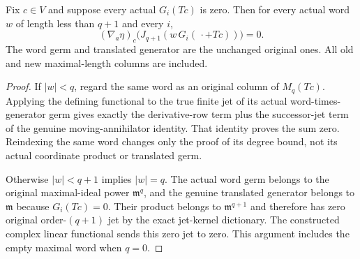 \begin{theorem}
\label{hir:actual-dual-jet-prolongation-all-next-columns-zero}
\leanok
Fix $c\in V$ and suppose every actual $G_i(Tc)$ is zero. Then for
every actual word $w$ of length less than $q+1$ and every $i$,
\[
 (\nabla_a\eta)_c
 \bigl(J_{q+1}(w\,G_i(\,\cdot+Tc))\bigr)=0.
\]
The word germ and translated generator are the unchanged original
ones. All old and new maximal-length columns are included.
\end{theorem}
\begin{proof}
If $|w|<q$, regard the same word as an original column of $M_q(Tc)$.
Applying the defining functional to the true finite jet of its actual
word-times-generator germ gives exactly the derivative-row term plus
the successor-jet term of the genuine moving-annihilator identity.
That identity proves the sum zero. Reindexing the same word changes
only the proof of its degree bound, not its actual coordinate product
or translated germ.

Otherwise $|w|<q+1$ implies $|w|=q$. The actual word germ belongs to
the original maximal-ideal power $\mathfrak m^q$, and the genuine
translated generator belongs to $\mathfrak m$ because $G_i(Tc)=0$.
Their product belongs to $\mathfrak m^{q+1}$ and therefore has zero
original order-$(q+1)$ jet by the exact jet-kernel dictionary. The
constructed complex linear functional sends this zero jet to zero.
This argument includes the empty maximal word when $q=0$.
\end{proof}

